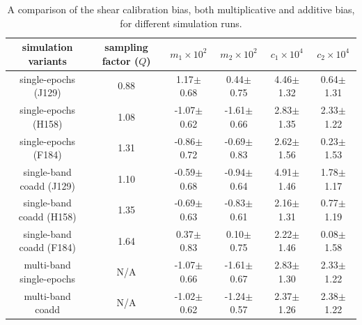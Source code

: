 \documentclass[fleqn,usenatbib]{mnras}
\begin{document}
\begin{table}
	\centering
	\begin{tabular}[width=\textwidth]{ c|c|c|c|c|c } 
		\hline
		simulation variants & sampling factor ($Q$) & $m_{1}\times10^{2}$ & $m_{2}\times10^{2}$ & $c_{1}\times10^{4}$ & $c_{2}\times10^{4}$\\
		\hline
		single-epochs (J129) & 0.88 & 1.17$\pm$0.68 & 0.44$\pm$0.75 & 4.46$\pm$1.32 & 0.64$\pm$1.31\\
		single-epochs (H158) & 1.08 & -1.07$\pm$0.62 & -1.61$\pm$0.66 & 2.83$\pm$1.35 & 2.33$\pm$1.22\\
		single-epochs (F184) & 1.31 & -0.86$\pm$0.72 & -0.69$\pm$0.83 & 2.62$\pm$1.56 & 0.23$\pm$1.53\\
		\hline
		single-band coadd (J129) & 1.10 & -0.59$\pm$0.68 & -0.94$\pm$0.64 & 4.91$\pm$1.46 & 1.78$\pm$1.17\\
		single-band coadd (H158) & 1.35 & -0.69$\pm$0.63 & -0.83$\pm$0.61 & 2.16$\pm$1.31 & 0.77$\pm$1.19\\
		single-band coadd (F184) & 1.64 & 0.37$\pm$0.83 & 0.10$\pm$0.75 & 2.22$\pm$1.46 & 0.08$\pm$1.58\\
		\hline
		multi-band single-epochs & N/A & -1.07$\pm$0.66 & -1.61$\pm$0.67 & 2.83$\pm$1.30 & 2.33$\pm$1.22 \\
		multi-band coadd & N/A & -1.02$\pm$0.62 & -1.24$\pm$0.57 & 2.37$\pm$1.26 & 2.38$\pm$1.22\\
		
		\hline
	\end{tabular}
	\caption{A comparison of the shear calibration bias, both multiplicative and additive bias, for different simulation runs.}
	\label{tab:bias_summary}
\end{table}
\end{document}
